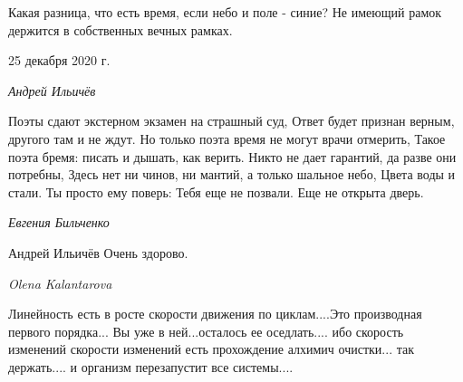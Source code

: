 Какая разница, что есть время, если небо и поле - синие?
Не имеющий рамок держится в собственных вечных рамках.

25 декабря 2020 г.

\emph{Андрей Ильичёв}

Поэты сдают экстерном экзамен на страшный суд,
Ответ будет признан верным, другого там и не ждут.
Но только поэта время не могут врачи отмерить,
Такое поэта бремя: писать и дышать, как верить.
Никто не дает гарантий, да разве они потребны,
Здесь нет ни чинов, ни мантий, а только шальное небо,
Цвета воды и стали. Ты просто ему поверь:
Тебя еще не позвали. Еще не открыта дверь.

\emph{Евгения Бильченко}

Андрей Ильичёв Очень здорово.

\emph{Olena Kalantarova}

Линейность есть в росте скорости движения по циклам....Это производная первого
порядка... Вы уже в ней...осталось ее оседлать.... ибо скорость изменений
скорости изменений есть прохождение алхимич очистки... так держать.... и
организм перезапустит все системы....
